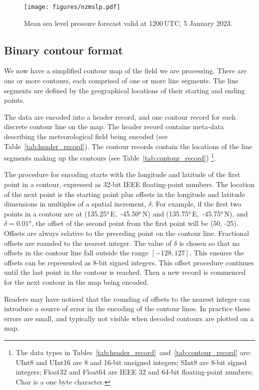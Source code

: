 \documentclass[12pt,a4paper]{article}
\begin{document}
\begin{figure*}
\centering
\texttt{[image: figures/nzmslp.pdf]}
\caption{\label{fig:nzmslp}Mean sea level pressure forecast valid at
1200\,UTC, 5 January 2023.}
\end{figure*}

\subsection*{Binary contour format}

We now have a simplified contour map of the field we are processing. There are
one or more contours, each comprised of one or more line segments. The line
segments are defined by the geographical locations of their starting and ending
points.

The data are encoded into a header record, and one contour record for each
discrete contour line on the map. The header record contains meta-data
describing the meteorological field being encoded (see
Table~\ref{tab:header_record}). The contour records contain the locations of
the line segments making up the contours (see Table~\ref{tab:contour_record})
\footnote{The data types in Tables~\ref{tab:header_record}~and~\ref{tab:contour_record}
are: UInt8 and UInt16 are 8 and 16-bit unsigned integers; SInt8 are 8-bit
signed integers; Float32 and Float64 are IEEE 32 and 64-bit floating-point
numbers; Char is a one byte character.}.

The procedure for encoding starts with the longitude and latitude
of the first point in a contour, expressed as 32-bit IEEE floating-point
numbers. The location of the next point is the starting point plus offsets in
the longitude and latitude dimensions in multiples of a spatial increment,
$\delta$. For example, if the first two points in a contour are at
(\ang{135.25}\,E,~\ang{-45.50}\,N) and (\ang{135.75}\,E,~\ang{-45.75}\,N), and
$\delta = \ang{0.01}$, the offset of the second point from the first point will
be (50, -25). Offsets are always relative to the preceding point on the contour
line. Fractional offsets are rounded to the nearest integer. The value of
$\delta$ is chosen so that no offsets in the contour line fall outside the
range $[-128, 127]$. This ensures the offsets can be represented as 8-bit signed
integers. This offset procedure continues until the last point in the contour
is reached. Then a new record is commenced for the next contour in the map
being encoded.

Readers may have noticed that the rounding of offsets to the nearest integer
can introduce a source of error in the encoding of the contour lines. In
practice these errors are small, and typically not visible when decoded
contours are plotted on a map.
\end{document}
